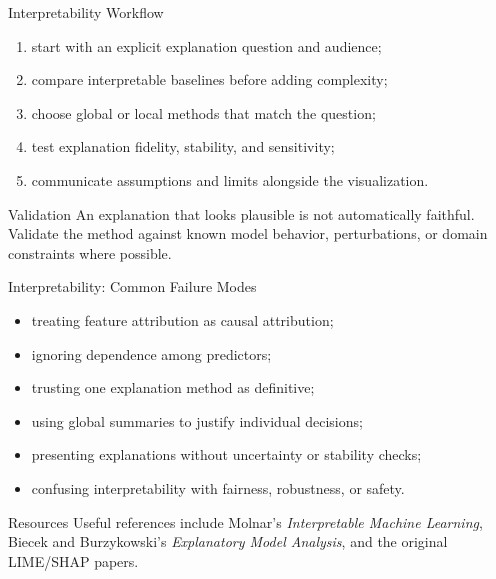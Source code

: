 \begin{frame}{Interpretability Workflow}
\begin{enumerate}
  \item start with an explicit explanation question and audience;
  \item compare interpretable baselines before adding complexity;
  \item choose global or local methods that match the question;
  \item test explanation fidelity, stability, and sensitivity;
  \item communicate assumptions and limits alongside the visualization.
\end{enumerate}

\begin{alertblock}{Validation}
An explanation that looks plausible is not automatically faithful. Validate the method against known model behavior, perturbations, or domain constraints where possible.
\end{alertblock}
\end{frame}

\begin{frame}{Interpretability: Common Failure Modes}
\begin{itemize}
  \item treating feature attribution as causal attribution;
  \item ignoring dependence among predictors;
  \item trusting one explanation method as definitive;
  \item using global summaries to justify individual decisions;
  \item presenting explanations without uncertainty or stability checks;
  \item confusing interpretability with fairness, robustness, or safety.
\end{itemize}

\begin{block}{Resources}
Useful references include Molnar's \textit{Interpretable Machine Learning}, Biecek and Burzykowski's \textit{Explanatory Model Analysis}, and the original LIME/SHAP papers.
\end{block}
\end{frame}



